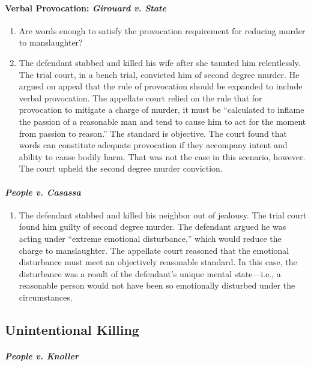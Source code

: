 \paragraph{Verbal Provocation: \emph{Girouard v. State}}

\begin{enumerate}
    \item Are words enough to satisfy the provocation requirement for reducing murder to manslaughter?
    \item The defendant stabbed and killed his wife after she taunted him relentlessly. The trial court, in a bench trial, convicted him of second degree murder. He argued on appeal that the rule of provocation should be expanded to include verbal provocation. The appellate court relied on the rule that for provocation to mitigate a charge of murder, it must be ``calculated to inflame the passion of a reasonable man and tend to cause him to act for the moment from passion to reason.'' The standard is objective. The court found that words can constitute adequate provocation if they accompany intent and ability to cause bodily harm. That was not the case in this scenario, however. The court upheld the second degree murder conviction.
\end{enumerate}

\paragraph{\emph{People v. Casassa}}

\begin{enumerate}
    \item The defendant stabbed and killed his neighbor out of jealousy. The trial court found him guilty of second degree murder. The defendant argued he was acting under ``extreme emotional disturbance,'' which would reduce the charge to manslaughter. The appellate court reasoned that the emotional disturbance must meet an objectively reasonable standard. In this case, the disturbance was a result of the defendant's unique mental state---i.e., a reasonable person would not have been so emotionally disturbed under the circumstances.
\end{enumerate}

\subsection{Unintentional Killing}

\paragraph{\emph{People v. Knoller}}

